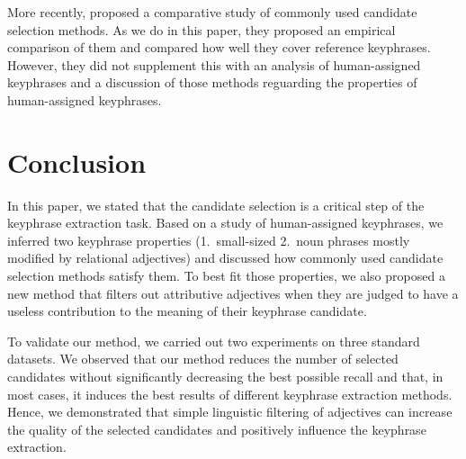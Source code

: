   More recently,  proposed a
  comparative study of commonly used candidate selection methods. As we do in
  this paper, they proposed an empirical comparison of them and compared how
  well they cover reference keyphrases. However, they did not supplement this
  with an analysis of human-assigned keyphrases and a discussion of those
  methods reguarding the properties of human-assigned keyphrases.

\section{Conclusion}
\label{sec:conclusion}
  In this paper, we stated that the candidate selection is a critical step of
  the keyphrase extraction task. Based on a study of human-assigned keyphrases,
  we inferred two keyphrase properties (1.~small-sized 2.~noun phrases mostly
  modified by relational adjectives) and
  discussed how commonly used candidate selection methods satisfy them. To best
  fit those properties, we also proposed a new method that filters out
  attributive adjectives when they are judged to have a useless contribution to
  the meaning of their keyphrase candidate.

  To validate our method, we carried out two experiments on three standard
  datasets. We observed that our method reduces the number of selected
  candidates without significantly decreasing the best possible recall and that,
  in most cases, it induces the best results of different keyphrase extraction
  methods. Hence, we demonstrated that simple linguistic filtering of adjectives
  can increase the quality of the selected candidates and positively influence
  the keyphrase extraction.

